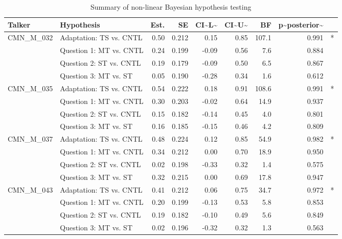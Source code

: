 \begin{table}

\caption{\label{tab:unnamed-chunk-21}Summary of non-linear Bayesian hypothesis testing}
\centering
\begin{tabular}[t]{l|l|r|r|r|r|r|r|l}
\hline
Talker & Hypothesis & Est. & SE & CI\textasciitilde{}L\textasciitilde{} & CI\textasciitilde{}U\textasciitilde{} & BF & p\textasciitilde{}posterior\textasciitilde{} & \\
\hline
CMN\_M\_032 & Adaptation: TS vs. CNTL & 0.50 & 0.212 & 0.15 & 0.85 & 107.1 & 0.991 & *\\
\hline
 & Question 1: MT vs. CNTL & 0.24 & 0.199 & -0.09 & 0.56 & 7.6 & 0.884 & \\
\hline
 & Question 2: ST vs. CNTL & 0.19 & 0.179 & -0.09 & 0.50 & 6.5 & 0.867 & \\
\hline
 & Question 3: MT vs. ST & 0.05 & 0.190 & -0.28 & 0.34 & 1.6 & 0.612 & \\
\hline
CMN\_M\_035 & Adaptation: TS vs. CNTL & 0.54 & 0.222 & 0.18 & 0.91 & 108.6 & 0.991 & *\\
\hline
 & Question 1: MT vs. CNTL & 0.30 & 0.203 & -0.02 & 0.64 & 14.9 & 0.937 & \\
\hline
 & Question 2: ST vs. CNTL & 0.15 & 0.182 & -0.14 & 0.45 & 4.0 & 0.801 & \\
\hline
 & Question 3: MT vs. ST & 0.16 & 0.185 & -0.15 & 0.46 & 4.2 & 0.809 & \\
\hline
CMN\_M\_037 & Adaptation: TS vs. CNTL & 0.48 & 0.224 & 0.12 & 0.85 & 54.9 & 0.982 & *\\
\hline
 & Question 1: MT vs. CNTL & 0.34 & 0.212 & 0.00 & 0.70 & 18.9 & 0.950 & \\
\hline
 & Question 2: ST vs. CNTL & 0.02 & 0.198 & -0.33 & 0.32 & 1.4 & 0.575 & \\
\hline
 & Question 3: MT vs. ST & 0.32 & 0.215 & 0.00 & 0.69 & 17.8 & 0.947 & \\
\hline
CMN\_M\_043 & Adaptation: TS vs. CNTL & 0.41 & 0.212 & 0.06 & 0.75 & 34.7 & 0.972 & *\\
\hline
 & Question 1: MT vs. CNTL & 0.20 & 0.199 & -0.13 & 0.53 & 5.8 & 0.853 & \\
\hline
 & Question 2: ST vs. CNTL & 0.19 & 0.182 & -0.10 & 0.49 & 5.6 & 0.849 & \\
\hline
 & Question 3: MT vs. ST & 0.02 & 0.196 & -0.32 & 0.32 & 1.3 & 0.563 & \\
\hline
\end{tabular}
\end{table}
